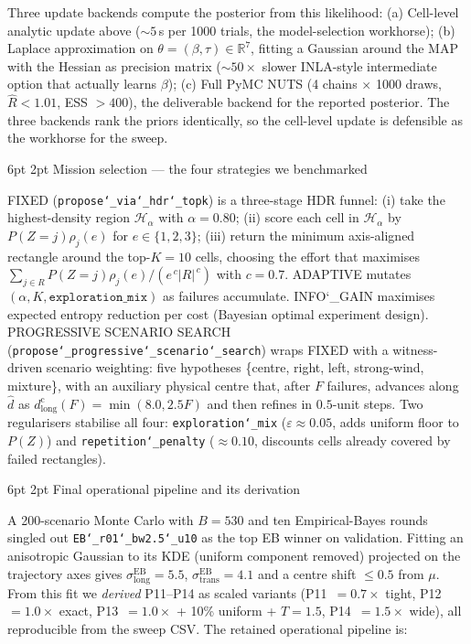\documentclass[11pt,a4paper]{article}
\makeatletter
\renewcommand\section{\@startsection{section}{1}{\z@}%
                                    {6pt \@plus 1pt \@minus 1pt}%
                                    {2pt}%
                                    {\normalfont\normalsize\bfseries}}
\makeatother
\begin{document}
Three update backends compute the posterior from this likelihood:
(a) Cell-level analytic update above ($\sim 5$\,s per 1000 trials,
the model-selection workhorse);
(b) Laplace approximation on $\theta = (\beta, \tau) \in \mathbb{R}^7$,
fitting a Gaussian around the MAP with the Hessian as precision matrix
($\sim 50\times$ slower INLA-style intermediate option that actually learns
$\beta$);
(c) Full PyMC NUTS (4 chains $\times$ 1000 draws, $\hat R < 1.01$,
ESS $> 400$), the deliverable backend for the reported posterior. The three
backends rank the priors identically, so the cell-level update is defensible
as the workhorse for the sweep.

\section{Mission selection --- the four strategies we benchmarked}

FIXED (\texttt{propose\char`_via\char`_hdr\char`_topk}) is a
three-stage HDR funnel: (i) take the highest-density region $\mathcal{H}_\alpha$
with $\alpha=0.80$; (ii) score each cell in $\mathcal{H}_\alpha$ by
$P(Z=j)\rho_j(e)$ for $e\in\{1,2,3\}$; (iii) return the minimum axis-aligned
rectangle around the top-$K=10$ cells, choosing the effort that maximises
$\sum_{j\in R} P(Z=j)\rho_j(e)/(e^{\,c}|R|^{\,c})$ with $c=0.7$.
ADAPTIVE mutates $(\alpha, K, \texttt{exploration\char`_mix})$ as
failures accumulate. INFO\char`_GAIN maximises expected entropy
reduction per cost (Bayesian optimal experiment design). PROGRESSIVE
SCENARIO SEARCH
(\texttt{propose\char`_progressive\char`_scenario\char`_search}) wraps FIXED
with a witness-driven scenario weighting: five hypotheses
\{centre, right, left, strong-wind, mixture\}, with an auxiliary physical
centre that, after $F$ failures, advances along $\hat{d}$ as
$d_{\mathrm{long}}^{\mathrm{c}}(F) = \min(8.0, 2.5F)$ and then refines in
$0.5$-unit steps. Two regularisers stabilise all four:
\texttt{exploration\char`_mix} ($\varepsilon\!\approx\!0.05$, adds uniform
floor to $P(Z)$) and \texttt{repetition\char`_penalty} ($\approx 0.10$,
discounts cells already covered by failed rectangles).

\section{Final operational pipeline and its derivation}

A 200-scenario Monte Carlo with $B=530$ and ten Empirical-Bayes rounds
singled out \texttt{EB\char`_r01\char`_bw2.5\char`_u10} as the top EB winner
on validation. Fitting an anisotropic Gaussian to its KDE (uniform component
removed) projected on the trajectory axes gives $\sigma_{\mathrm{long}}^{\mathrm{EB}}
= 5.5$, $\sigma_{\mathrm{trans}}^{\mathrm{EB}} = 4.1$ and a centre shift
$\le 0.5$ from $\mu$. From this fit we \emph{derived} P11--P14 as scaled
variants (P11~$=0.7\times$ tight, P12~$=1.0\times$ exact, P13~$=1.0\times$
+ 10\% uniform + $T=1.5$, P14~$=1.5\times$ wide), all reproducible from the
sweep CSV. The retained operational pipeline is:
\end{document}
